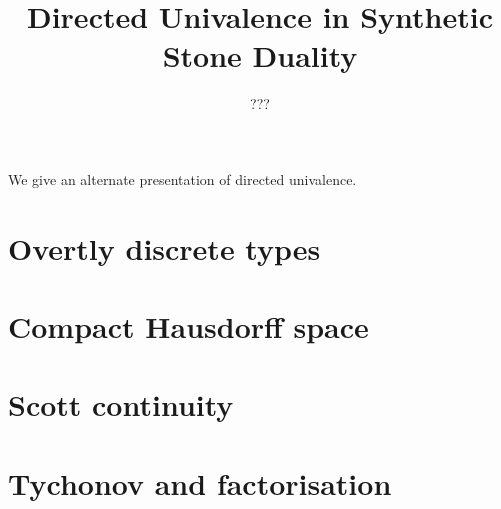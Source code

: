 \documentclass{../util/zariski}
\title{Directed Univalence in Synthetic Stone Duality}
\begin{document}
\author{???}

\maketitle

We give an alternate presentation of directed univalence.


\tableofcontents

\section{Overtly discrete types}


\section{Compact Hausdorff space}


\section{Scott continuity}


\section{Tychonov and factorisation}
%

\printbibliography
\end{document}
